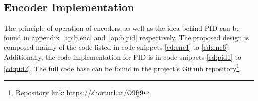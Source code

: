 \subsection{Encoder Implementation}
\vspace{-1mm}
The principle of operation of encoders, as well as the idea behind PID can be found in appendix~\ref{ap:b.enc} and~\ref{ap:b.pid} respectively. The proposed design is composed mainly of the code listed in code snippets \ref{cd:enc1} to \ref{cd:enc6}. Additionally, the code implementation for PID is in code snippets \ref{cd:pid1} to \ref{cd:pid2}. The full code base can be found in the project's Github repository\footnote{Repository link: \url{https://shorturl.at/O9fj9}}.
\vspace{1mm}





\newpage





% 

\newpage

\vspace{-3mm}
% 
% 

